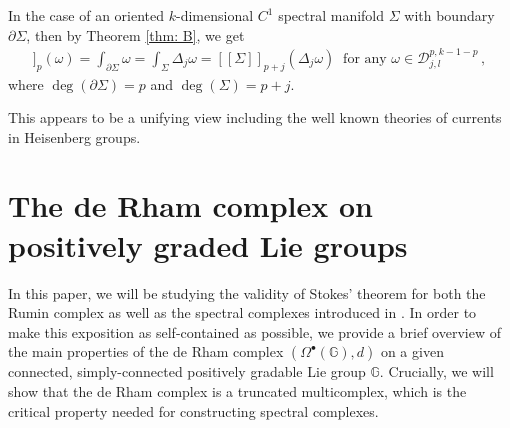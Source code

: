 \documentclass[dvipsnames]{amsart}
\theoremstyle{definition}
\theoremstyle{definition}
\numberwithin{equation}{section}
\newcommand{\G}{\mathbb{G}}
\begin{document}
In the case of an oriented $k$-dimensional $C^1$ spectral manifold $\Sigma$ with boundary $\partial\Sigma$, then by Theorem \ref{thm: B}, we get
\begin{align*}
    [[\partial^j\Sigma]]_p(\omega)=\int_{\partial\Sigma}\omega=\int_\Sigma\Delta_j\omega=[[\Sigma]]_{p+j}(\Delta_j\omega)\ \text{ for any }\omega\in \mathscr D_{j,l}^{p,k-1-p}\,,
\end{align*}
where $\operatorname{deg}(\partial\Sigma)=p$ and $\operatorname{deg}(\Sigma)=p+j$.

This appears to be a unifying view including the well known theories of currents in Heisenberg groups.







 
\section{The de Rham complex on positively graded Lie groups}
In this paper, we will be studying the validity of Stokes' theorem for both the Rumin complex as well as the spectral complexes introduced in \cite{tripaldi2026spectralcomplexestruncatedmulticomplexes}. In order to make this exposition as self-contained as possible, we provide a brief overview of the main properties of the de Rham complex $(\Omega^\bullet(\G),d)$ on a given connected, simply-connected positively gradable Lie group $\G$. Crucially, we will show that the de Rham complex is a truncated multicomplex, which is the critical property needed for constructing spectral complexes. 
\end{document}
